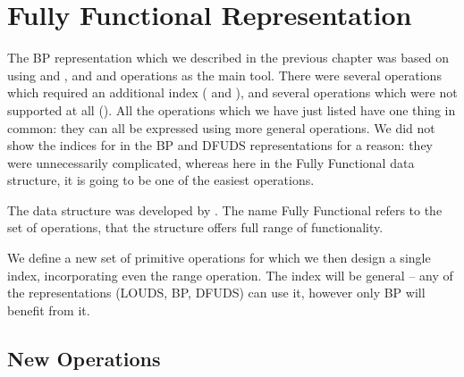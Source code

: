 
\section{Fully Functional Representation}

The BP representation which we described in the previous chapter was based on using \rank{} and \select{}, and \match{} and \enclose{} operations as the main tool.
There were several operations which required an additional index (\childAny{} and \levelAncestor{}), and several operations which were not supported at all (\levelAny{}).
All the operations which we have just listed have one thing in common: they can all be expressed using more general operations.
We did not show the indices for \levelAncestor{} in the BP and DFUDS representations for a reason: they were unnecessarily complicated, whereas here in the Fully Functional data structure, it is going to be one of the easiest operations.

The data structure was developed by \cite{sadakane2010fully}.
The name Fully Functional refers to the set of operations, that the structure offers full range of functionality.

We define a new set of primitive operations for which we then design a single index, incorporating even the range operation.
The index will be general -- any of the representations (LOUDS, BP, DFUDS) can use it, however only BP will benefit from it.

\subsection{New Operations}

